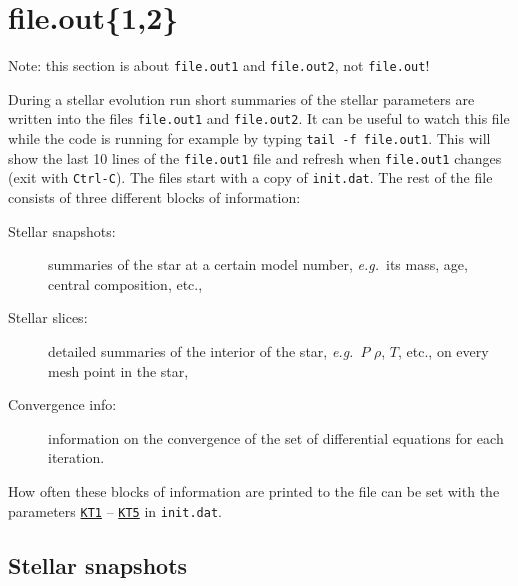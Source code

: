 \section{file.out\{1,2\}}

Note: this section is about \texttt{file.out1} and \texttt{file.out2}, 
not \texttt{file.out}!

During a stellar evolution run short summaries of the stellar parameters are written 
into the files \texttt{file.out1} and \texttt{file.out2}. It can be useful to watch this file while 
the code is running for example by typing \texttt{tail -f file.out1}.
This will show the last 10 lines of the \texttt{file.out1} file and refresh when \texttt{file.out1} 
changes (exit with \texttt{Ctrl-C}).
The files start with a copy of \texttt{init.dat}. The rest of the file consists of 
three different blocks of information:
\begin{description}
\item[Stellar snapshots:] summaries of the star at a certain model number, \emph{e.g.}\ 
  its mass, age, central composition, etc.,
\item[Stellar slices:] detailed summaries of the interior of the star, \emph{e.g.}\ $P$ 
  $\rho$, $T$, etc., on every mesh point in the star,
\item[Convergence info:] information on the convergence of the set of differential equations 
  for each iteration.
\end{description}

How often these blocks of information are printed to the file can be set with the
parameters \texttt{\hyperlink{kt1}{KT1}} -- \texttt{\hyperlink{kt5}{KT5}} in \texttt{init.dat}.



\subsection{Stellar snapshots}

